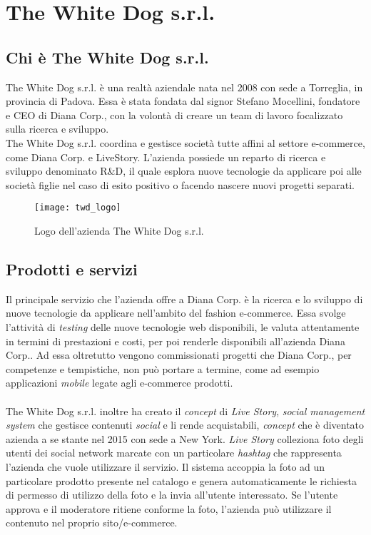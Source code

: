 \newpage
\chapter{The White Dog s.r.l.}
\label{cap:thewhitedog}

\section{Chi è The White Dog s.r.l.}

The White Dog s.r.l. è una realtà aziendale nata nel 2008 con sede a Torreglia, in provincia di Padova. Essa è stata fondata dal signor Stefano Mocellini, fondatore e CEO di Diana Corp., con la volontà di creare un team di lavoro focalizzato sulla ricerca e sviluppo. \\
The White Dog s.r.l. coordina e gestisce società tutte affini al settore e-commerce, come Diana Corp. e LiveStory. L'azienda possiede un reparto di ricerca e sviluppo denominato R\&D, il quale esplora nuove tecnologie da applicare poi alle società figlie nel caso di esito positivo o facendo nascere nuovi progetti separati.

\label{The White Dog s.r.l.}
\begin{figure}[ht]
	\begin{center}
		\texttt{[image: twd\_logo]}
		\caption{Logo dell'azienda The White Dog s.r.l.}
	\end{center}
\end{figure}
\FloatBarrier

\section{Prodotti e servizi}

Il principale servizio che l'azienda offre a Diana Corp. è la ricerca e lo sviluppo di nuove tecnologie da applicare nell'ambito del fashion e-commerce. Essa svolge l'attività di \textit{testing} delle nuove tecnologie web disponibili, le valuta attentamente in termini di prestazioni e costi, per poi renderle disponibili all'azienda Diana Corp.. Ad essa oltretutto vengono commissionati progetti che Diana Corp., per competenze e tempistiche, non può portare a termine, come ad esempio applicazioni \textit{mobile} legate agli e-commerce prodotti. \\ \\
The White Dog s.r.l. inoltre ha creato il \textit{concept} di \textit{Live Story}, \textit{social management system} che gestisce contenuti \textit{social} e li rende acquistabili, \textit{concept} che è diventato azienda a se stante nel 2015 con sede a New York. \textit{Live Story} colleziona foto degli utenti dei social network marcate con un particolare \textit{hashtag} che rappresenta l'azienda che vuole utilizzare il servizio. Il sistema accoppia la foto ad un particolare prodotto presente nel catalogo e genera automaticamente le richiesta di permesso di utilizzo della foto e la invia all'utente interessato. Se l'utente approva e il moderatore ritiene conforme la foto, l'azienda può utilizzare il contenuto nel proprio sito/e-commerce.

